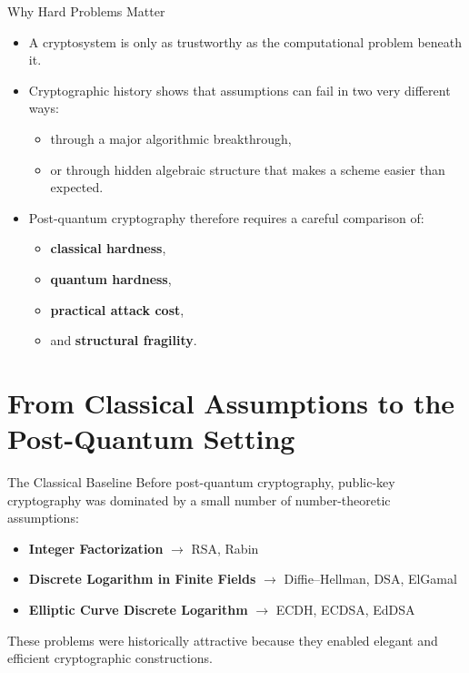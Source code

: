 \documentclass[aspectratio=169]{beamer}
\begin{document}
	\begin{frame}{Why Hard Problems Matter}
		\begin{itemize}
			\item A cryptosystem is only as trustworthy as the computational problem beneath it.
			\item Cryptographic history shows that assumptions can fail in two very different ways:
			\begin{itemize}
				\item through a major algorithmic breakthrough,
				\item or through hidden algebraic structure that makes a scheme easier than expected.
			\end{itemize}
			\item Post-quantum cryptography therefore requires a careful comparison of:
			\begin{itemize}
				\item \textbf{classical hardness},
				\item \textbf{quantum hardness},
				\item \textbf{practical attack cost},
				\item and \textbf{structural fragility}.
			\end{itemize}
		\end{itemize}
	\end{frame}
	
	\section{From Classical Assumptions to the Post-Quantum Setting}
	
	\begin{frame}{The Classical Baseline}
		Before post-quantum cryptography, public-key cryptography was dominated by a small number of number-theoretic assumptions:
		\begin{itemize}
			\item \textbf{Integer Factorization} $\rightarrow$ RSA, Rabin
			\item \textbf{Discrete Logarithm in Finite Fields} $\rightarrow$ Diffie--Hellman, DSA, ElGamal
			\item \textbf{Elliptic Curve Discrete Logarithm} $\rightarrow$ ECDH, ECDSA, EdDSA
		\end{itemize}
		
		\vspace{0.5em}
		These problems were historically attractive because they enabled elegant and efficient cryptographic constructions.
	\end{frame}
	
\end{document}
